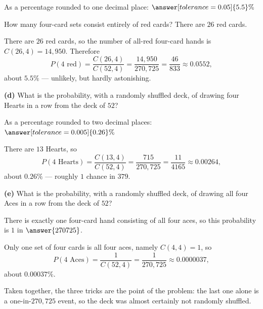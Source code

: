 \documentclass[12pt]{ximera}
\begin{document}
\begin{problem}
\begin{prompt}
As a percentage rounded to one decimal place: $\answer[tolerance=0.05]{5.5}\%$

\begin{hint}
How many four-card sets consist entirely of red cards? There are $26$ red cards.
\end{hint}

\begin{feedback}
There are $26$ red cards, so the number of all-red four-card hands is
$C(26,4)=14{,}950$. Therefore
\[
P(\text{4 red}) = \frac{C(26,4)}{C(52,4)}=\frac{14{,}950}{270{,}725}=\frac{46}{833}\approx 0.0552,
\]
about $5.5\%$ --- unlikely, but hardly astonishing.
\end{feedback}
\end{prompt}

\begin{prompt}
\textbf{(d)} What is the probability, with a randomly shuffled deck, of drawing four
Hearts in a row from the deck of $52$?

As a percentage rounded to two decimal places: $\answer[tolerance=0.005]{0.26}\%$

\begin{feedback}
There are $13$ Hearts, so
\[
P(\text{4 Hearts}) = \frac{C(13,4)}{C(52,4)}=\frac{715}{270{,}725}=\frac{11}{4165}\approx 0.00264,
\]
about $0.26\%$ --- roughly $1$ chance in $379$.
\end{feedback}
\end{prompt}

\begin{prompt}
\textbf{(e)} What is the probability, with a randomly shuffled deck, of drawing all
four Aces in a row from the deck of $52$?

There is exactly one four-card hand consisting of all four aces, so this probability
is $1$ in $\answer{270725}$.

\begin{feedback}
Only one set of four cards is all four aces, namely $C(4,4)=1$, so
\[
P(\text{4 Aces}) = \frac{1}{C(52,4)}=\frac{1}{270{,}725}\approx 0.0000037,
\]
about $0.00037\%$.

Taken together, the three tricks are the point of the problem: the last one alone is
a one-in-$270{,}725$ event, so the deck was almost certainly not randomly shuffled.
\end{feedback}
\end{prompt}
\end{problem}
\end{document}
